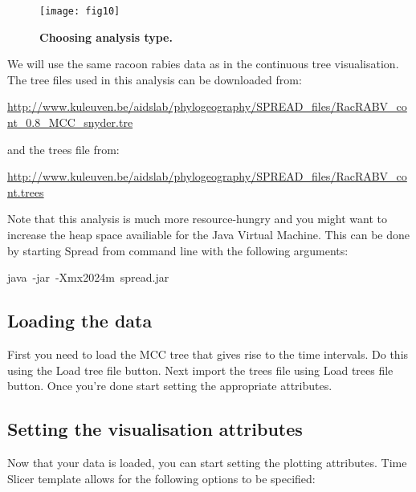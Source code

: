 \begin{figure}[H]
\begin{centering}
\texttt{[image: fig10]}
\caption{
{ \footnotesize 
{\bf Choosing analysis type.}
} %
}
\label{fig:10}
\par\end{centering}
\end{figure}

We will use the same racoon rabies data as in the continuous tree
visualisation. The tree files used in this analysis can be downloaded
from:

\url{http://www.kuleuven.be/aidslab/phylogeography/SPREAD_files/RacRABV_cont_0.8_MCC_snyder.tre}

\noindent
and the trees file from:

\url{http://www.kuleuven.be/aidslab/phylogeography/SPREAD_files/RacRABV_cont.trees}

\noindent
Note that this analysis is much more resource-hungry and you might
want to increase the heap space availiable for the Java Virtual Machine.
This can be done by starting Spread from command line with the following
arguments: 

\begin{lyxcode}
java~-jar~-Xmx2024m~spread.jar
\end{lyxcode}

\subsection{Loading the data}

First you need to load the MCC tree that gives rise to the time intervals.
Do this using the Load tree file button. Next import the trees file
using Load trees file button. Once you're done start setting the appropriate
attributes.


\subsection{Setting the visualisation attributes}

Now that your data is loaded, you can start setting the plotting attributes.
Time Slicer template allows for the following options to be specified: 

